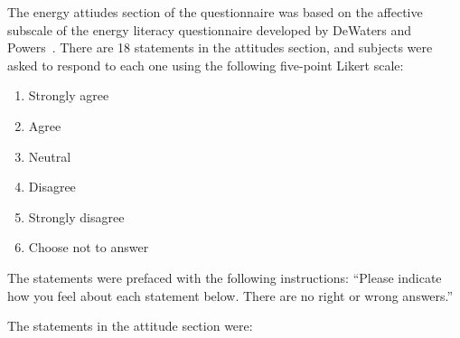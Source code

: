 The energy attiudes section of the questionnaire was based on the affective subscale of the energy literacy questionnaire developed by DeWaters and Powers~\cite{DeWaters2011}. There are 18 statements in the attitudes section, and subjects were asked to respond to each one using the following five-point Likert scale:

\begin{enumerate}
	\item Strongly agree
	\item Agree
	\item Neutral
	\item Disagree
	\item Strongly disagree
	\item Choose not to answer
\end{enumerate}

The statements were prefaced with the following instructions: ``Please indicate how you feel about each statement below. There are no right or wrong answers.''

The statements in the attitude section were:

